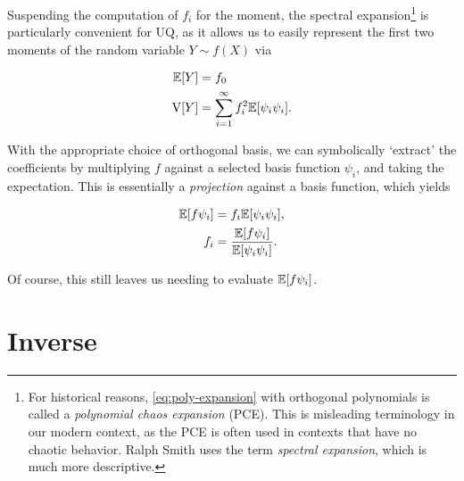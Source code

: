 \documentclass[../primer.tex]{subfiles}
\begin{document}
Suspending the computation of $f_i$ for the moment, the spectral
expansion\footnote{For historical reasons, \eqref{eq:poly-expansion} with
  orthogonal polynomials is called a \emph{polynomial chaos expansion} (PCE).
  This is misleading terminology in our modern context, as the PCE is often used
  in contexts that have no chaotic behavior. Ralph Smith uses the term
  \emph{spectral expansion}, which is much more descriptive.} is particularly
convenient for UQ, as it allows us to easily represent the first two moments of
the random variable $Y\sim f(X)$ via

\begin{equation} \begin{aligned}
  \mathbb{E}[Y] &= f_0 \\
  \mathrm{V}[Y] &= \sum_{i=1}^{\infty} f_i^2 \mathbb{E}[\psi_i\psi_i].
\end{aligned} \end{equation}

With the appropriate choice of orthogonal basis, we can symbolically `extract'
the coefficients by multiplying $f$ against a selected basis function $\psi_i$,
and taking the expectation. This is essentially a \emph{projection} against a
basis function, which yields

\begin{equation} \begin{aligned}
  \mathbb{E}[f \psi_i] &= f_i \mathbb{E}[\psi_i \psi_i], \\
  f_i &= \frac{\mathbb{E}[f \psi_i]}{\mathbb{E}[\psi_i \psi_i]}.
\end{aligned} \end{equation}

\noindent Of course, this still leaves us needing to evaluate $\mathbb{E}[f \psi_i]$.

\section{Inverse}
\end{document}
